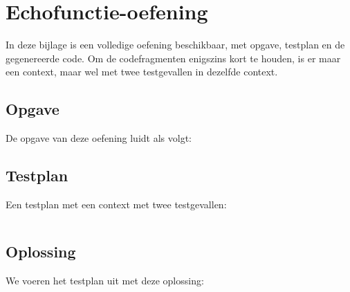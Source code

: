 \chapter{Echofunctie-oefening}\label{ch:echo-function-oefening}

In deze bijlage is een volledige oefening beschikbaar, met opgave, testplan en de gegenereerde code.
Om de codefragmenten enigszins kort te houden, is er maar een context, maar wel met twee testgevallen in dezelfde context.

\section{Opgave}\label{sec:echo-function-opgave}

De opgave van deze oefening luidt als volgt:

\begin{quote}
\end{quote}

\section{Testplan}\label{sec:echo-function-testplan}

Een testplan met een context met twee testgevallen:

\inputminted{json}{../../exercise/echo-function/evaluation/one-testcase.tson}

\section{Oplossing}\label{sec:echo-function-oplossing}

We voeren het testplan uit met deze oplossing:

\inputminted{c}{../../exercise/echo-function/solution/correct.c}

